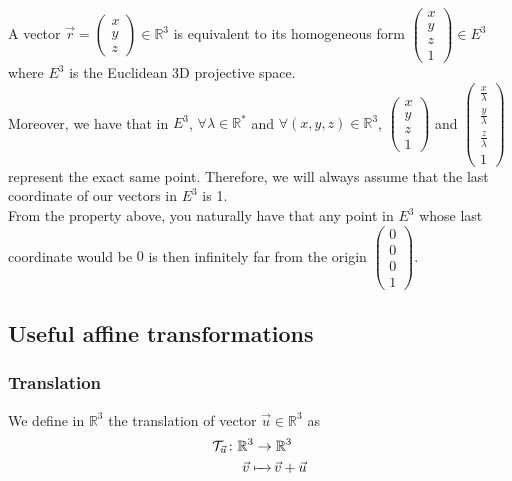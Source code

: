 \documentclass[class=report, float=false, crop=false]{standalone}
\begin{document}
A vector \(\vec{r} = \begin{pmatrix} x \\ y \\ z \end{pmatrix} \in \mathbb{R}^3\) is equivalent to its homogeneous form \(\begin{pmatrix} x \\ y \\ z \\ 1 \end{pmatrix} \in E^3\) where $E^3$ is the Euclidean 3D projective space.\\

Moreover, we have that in $E^3$, $\forall \lambda \in \mathbb{R}^*$ and $\forall (x,y,z) \in \mathbb{R}^3$, \(\begin{pmatrix} x \\ y \\ z \\ 1 \end{pmatrix}\) and \(\begin{pmatrix} \frac{x}{\lambda} \\ \frac{y}{\lambda} \\ \frac{z}{\lambda} \\ 1 \end{pmatrix}\) represent the exact same point. Therefore, we will always assume that the last coordinate of our vectors in $E^3$ is 1.\\

From the property above, you naturally have that any point in $E^3$ whose last coordinate would be $0$ is then infinitely far from the origin \(\begin{pmatrix} 0 \\ 0 \\ 0 \\ 1 \end{pmatrix}\).

\subsection{Useful affine transformations}

\subsubsection{Translation}

We define in $\mathbb{R}^3$ the translation of vector $\vec{u} \in \mathbb{R}^3$ as
\begin{align*}
\mathcal{T}_{\vec{u}} \colon &\mathbb{R}^3 \to \mathbb{R}^3\\     &\phantomarrow{\mathbb{R}^3}{\vec{v}} \vec{v} + \vec{u}
\end{align*}
\end{document}
